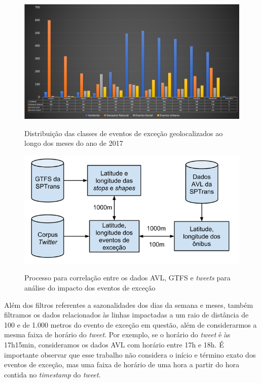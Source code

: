 \documentclass[
	12pt,				%
	oneside,			%
	a4paper,			%
	english,			%
	brazil				%
	]{abntex2ppgsi}
\begin{document}
{{{\begin{figure}[!htb]
	\centering
 	  \caption{Distribuição das classes de eventos de exceção geolocalizados ao longo dos meses do ano de 2017}
		\includegraphics[width=1\linewidth]{images/exception_events_classification_distribution_pt.png}
	\label{fig:exception_events_classification_distribution}
\end{figure}

\begin{figure}[!htb]
	\centering
 	  \caption{Processo para correlação entre os dados AVL, GTFS e \textit{tweets} para análise do impacto dos eventos de exceção}
		\includegraphics[width=0.7\linewidth]{images/avl_tweets_correlation_pt.png}
	\label{fig:avl_tweets_correlation_pt}
\end{figure}

Além dos filtros referentes a sazonalidades dos dias da semana e meses, também filtramos os dados relacionados às linhas impactadas a um raio de distância de 100 e de 1.000 metros do evento de exceção em questão, além de considerarmos a mesma faixa de horário do \textit{tweet}. Por exemplo, se o horário do \textit{tweet} é às 17h15min, consideramos os dados AVL com horário entre 17h e 18h. É importante observar que esse trabalho não considera o início e término exato dos eventos de exceção, mas uma faixa de horário de uma hora a partir do hora contida no \textit{timestamp}  do \textit{tweet}.

}}}
\end{document}
